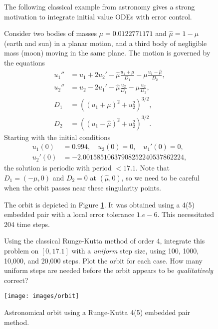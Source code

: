 \begin{figure}
  \begin{problem}[A\&P 4.12]
    The following classical example from astronomy gives a strong motivation to integrate initial value ODEs with error control.
  
    Consider two bodies of masses $\mu = 0.0122771171$ and $\hat{\mu}= 1 - \mu$ (earth and sun) in a planar motion, and a third body of negligible mass (moon) moving in the same plane. The motion is governed by the equations
    \begin{align*}
      u_1'' &= u_1 + 2u_2' - \hat{\mu} \frac{u_1 + \mu}{D_1} - \mu \frac{u_1 - \hat{\mu}}{D_2}, \\
      u_2'' &= u_2 - 2u_1' - \hat{\mu}\frac{u_2}{D_1} - \mu\frac{u_2}{D_2}, \\
      D_1 &= ((u_1 + \mu)^2 + u_2^2)^{3/2}, \\
      D_2 &= ((u_1 - \hat{\mu})^2 + u_2^2)^{3/2}.
    \end{align*}
    Starting with the initial conditions
    \begin{align*}
      u_1(0) &= 0.994, \quad u_2(0) = 0, \quad u_1'(0) = 0, \\
      u_2'(0) &= -2.00158510637908252240537862224,
    \end{align*}
    the solution is periodic with period $< 17.1$. Note that $D_1 = (-\mu, 0)$ and $D_2 = 0$ at $(\hat{\mu},0)$, so we need to be careful when the orbit passes near these singularity points.
  
    The orbit is depicted in Figure \ref{F:orbit}. It was obtained using a 4(5) embedded pair with a local error tolerance $1.e - 6$. This necessitated 204 time steps.
  
    Using the classical Runge-Kutta method of order 4, integrate this problem on $[0,17.1]$ with a \emph{uniform} step size, using 100, 1000, 10,000, and 20,000 steps. Plot the orbit for each case. How many uniform steps are needed before the orbit appears to be \emph{qualitatively} correct?
    
    \centering
    \texttt{[image: images/orbit]}
    \caption{Astronomical orbit using a Runge-Kutta 4(5) embedded pair method.}
    \label{F:orbit}
  \end{problem}
\end{figure}

\FloatBarrier

